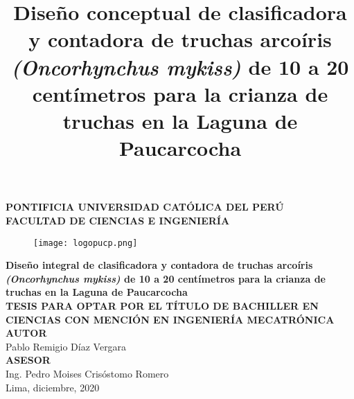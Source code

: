 \clearpage{\pagestyle{empty}\cleardoublepage}
\begin{titlepage}
	\begin{center}
		{\Large \bf PONTIFICIA UNIVERSIDAD CATÓLICA DEL PERÚ}\\
		\vspace{0.8 cm} 
		{\Large \bf FACULTAD DE CIENCIAS E INGENIERÍA}\\
		\vspace{1.75 cm}
		\begin{figure}[H]
			\centering
			\texttt{[image: logopucp.png]}
		\end{figure}
		\vspace{0.25cm}
		
		\title{Diseño conceptual de clasificadora y contadora de truchas arcoíris \textit{(Oncorhynchus mykiss)} de 10 a 20 centímetros para la crianza de truchas en la Laguna de Paucarcocha} %
		{\Large \bf Diseño integral de clasificadora y contadora de truchas arcoíris \textit{(Oncorhynchus mykiss)} de 10 a 20 centímetros para la crianza de truchas en la Laguna de Paucarcocha}\\ %
		\vspace{0.5cm}
		{\Large \bf TESIS PARA OPTAR POR EL TÍTULO DE BACHILLER EN CIENCIAS CON MENCIÓN EN INGENIERÍA MECATRÓNICA}\\[1.5 cm]
		{\large \bf AUTOR}\\[0.5cm]
		{\large Pablo Remigio Díaz Vergara}\\[1.5 cm] %
		{\large \bf ASESOR}\\[0.5 cm] 
		{\large Ing. Pedro Moises Crisóstomo Romero}\\[0.5 cm] %
		\vspace{2.0 cm}
		{\large Lima, diciembre, 2020}
		
	\end{center}
\end{titlepage}
